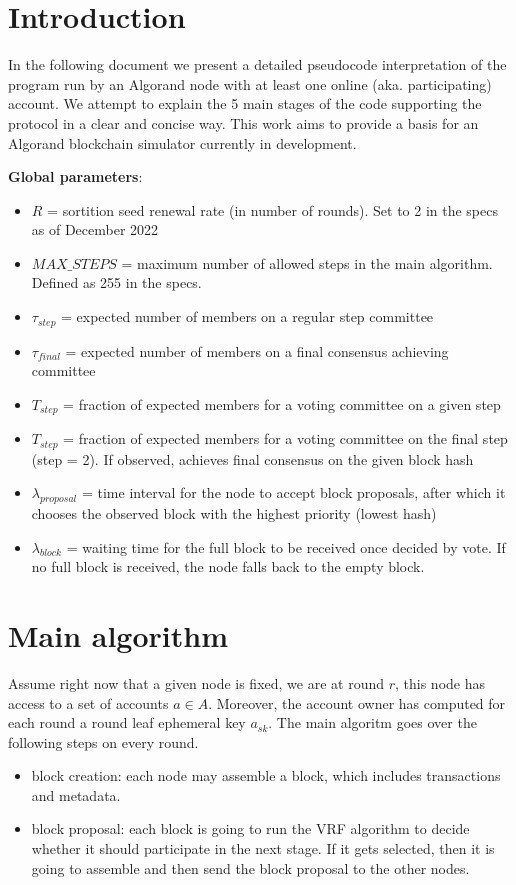 \documentclass[10pt,a4paper]{article}
\begin{document}
\section{Introduction}
In the following document we present a detailed pseudocode interpretation 
of the program run by an Algorand node with at least one online (aka. 
participating)
account. We attempt to explain the 5 main stages of the code supporting 
the protocol in a clear and concise way.
This work aims to provide a basis for an Algorand blockchain simulator 
currently in development. \newline

\noindent \textbf{Global parameters}:
\begin{itemize}
    \item $R$ = sortition seed renewal rate (in number of rounds). Set to 2 in the specs
    as of December 2022
    \item $MAX\_STEPS$ = maximum number of allowed steps in the main algorithm. Defined 
    as 255 in the specs.
    \item $\tau_{step}$ = expected number of members on a regular step committee
    \item $\tau_{final}$ = expected number of members on a final consensus achieving committee
    \item $T_{step}$ = fraction of expected members for a voting committee on a given step
    \item $T_{step}$ = fraction of expected members for a voting committee on the final step (step = 2). If observed,
    achieves final consensus on the given block hash
    \item $\lambda_{proposal}$ = time interval for the node to accept block proposals, after
    which it chooses the observed block with the highest priority (lowest hash) 
    \item $\lambda_{block}$ = waiting time for the full block to be received once decided by vote.
    If no full block is received, the node falls back to the empty block.
  \end{itemize}


\section{Main algorithm}

Assume right now that a given node is fixed, we are at round $r$,
this node has access to a set of accounts $a\in A$. Moreover,
the account owner has computed for each round a round 
leaf ephemeral key $a_{sk}$.
The main algoritm goes over the following steps on every round.
\begin{itemize}
    \item block creation: each node may assemble a block, which includes 
transactions and metadata.
    \item block proposal: each block is going to run the VRF algorithm
    to decide whether it should participate in the next stage. If it
    gets selected, then it is going to assemble and then send the block 
    proposal to the other nodes.
\end{itemize}
\end{document}
